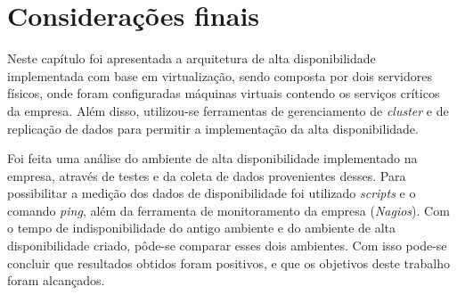 \section{Considerações finais}

Neste capítulo foi apresentada a arquitetura de alta disponibilidade implementada com base em virtualização, sendo composta por dois servidores 
físicos, onde foram configuradas máquinas virtuais contendo os serviços críticos da empresa. Além disso, utilizou-se ferramentas de gerenciamento 
de \textit{cluster} e de replicação de dados para permitir a implementação da alta disponibilidade.

Foi feita uma análise do ambiente de alta disponibilidade implementado na empresa, através de testes e da coleta de dados provenientes desses. 
Para possibilitar a medição dos dados de disponibilidade foi utilizado \textit{scripts} e o comando \textit{ping}, além da ferramenta de 
monitoramento da empresa (\textit{Nagios}). Com o tempo de indisponibilidade do antigo ambiente e do ambiente de alta disponibilidade criado,
pôde-se comparar esses dois ambientes.
Com isso pode-se concluir que resultados obtidos foram positivos, e que os objetivos deste trabalho foram alcançados. 

